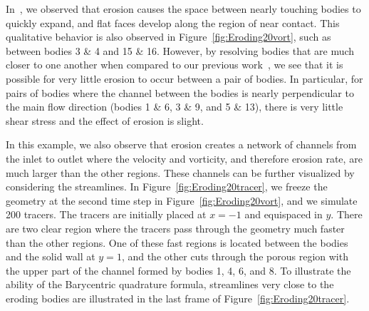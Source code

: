 \documentclass[preprint, 10pt]{elsarticle}
\begin{document}
In~\cite{qua-moo2018}, we observed that erosion causes the space between
nearly touching bodies to quickly expand, and flat faces develop along
the region of near contact.  This qualitative behavior is also observed
in Figure~\ref{fig:Eroding20vort}, such as between bodies 3 \& 4 and 15
\& 16.  However, by resolving bodies that are much closer to one another
when compared to our previous work~\cite{qua-moo2018}, we see that it is
possible for very little erosion to occur between a pair of bodies.  In
particular, for pairs of bodies where the channel between the bodies is
nearly perpendicular to the main flow direction (bodies 1 \& 6, 3 \& 9,
and 5 \& 13), there is very little shear stress and the effect of
erosion is slight. 

In this example, we also observe that erosion creates a network of
channels from the inlet to outlet where the velocity and vorticity, and
therefore erosion rate, are much larger than the other regions.  These
channels can be further visualized by considering the streamlines.  In
Figure~\ref{fig:Eroding20tracer}, we freeze the geometry at the second
time step in Figure~\ref{fig:Eroding20vort}, and we simulate 200
tracers.  The tracers are initially placed at $x=-1$ and equispaced in
$y$.  There are two clear region where the tracers pass through the
geometry much faster than the other regions.  One of these fast regions
is located between the bodies and the solid wall at $y=1$, and the other
cuts through the porous region with the upper part of the channel formed
by bodies 1, 4, 6, and 8.  To illustrate the ability of the Barycentric
quadrature formula, streamlines very close to the eroding bodies are
illustrated in the last frame of Figure~\ref{fig:Eroding20tracer}. 
\end{document}
